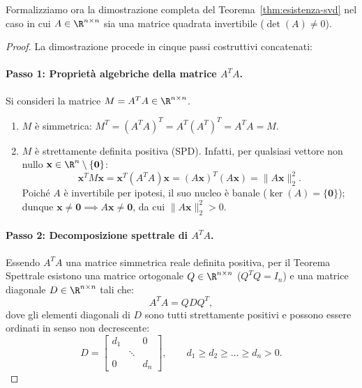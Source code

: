 Formalizziamo ora la dimostrazione completa del Teorema~\ref{thm:esistenza-svd} nel caso in cui $A \in \R^{n \times n}$ sia una matrice quadrata invertibile ($\det(A) \neq 0$).

\begin{proof}
La dimostrazione procede in cinque passi costruttivi concatenati:

\paragraph{Passo 1: Propriet\`a algebriche della matrice $A^T A$.}
Si consideri la matrice $M = A^T A \in \R^{n \times n}$.
\begin{enumerate}
    \item $M$ \`e simmetrica: $M^T = (A^T A)^T = A^T (A^T)^T = A^T A = M$.
    \item $M$ \`e strettamente definita positiva (SPD). Infatti, per qualsiasi vettore non nullo $\mathbf{x} \in \R^n \setminus \{\mathbf{0}\}$:
    \begin{equation}
        \mathbf{x}^T M \mathbf{x} = \mathbf{x}^T (A^T A) \mathbf{x} = (A\mathbf{x})^T (A\mathbf{x}) = \|A\mathbf{x}\|_2^2.
    \end{equation}
    Poich\'e $A$ \`e invertibile per ipotesi, il suo nucleo \`e banale ($\ker(A) = \{\mathbf{0}\}$); dunque $\mathbf{x} \neq \mathbf{0} \implies A\mathbf{x} \neq \mathbf{0}$, da cui $\|A\mathbf{x}\|_2^2 > 0$.
\end{enumerate}

\paragraph{Passo 2: Decomposizione spettrale di $A^T A$.}
Essendo $A^T A$ una matrice simmetrica reale definita positiva, per il Teorema Spettrale esistono una matrice ortogonale $Q \in \R^{n \times n}$ ($Q^T Q = I_n$) e una matrice diagonale $D \in \R^{n \times n}$ tali che:
\begin{equation}
    A^T A = Q D Q^T,
\end{equation}
dove gli elementi diagonali di $D$ sono tutti strettamente positivi e possono essere ordinati in senso non decrescente:
\begin{equation}
    D = \begin{bmatrix}
        d_1 & & 0 \\
        & \ddots & \\
        0 & & d_n
    \end{bmatrix}, \qquad d_1 \ge d_2 \ge \dots \ge d_n > 0.
\end{equation}


\end{proof}
